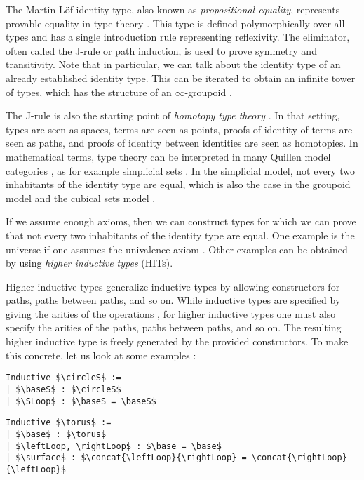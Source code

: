 The Martin-Löf identity type, also known as \emph{propositional equality}, represents provable equality in type theory \cite{martin1975intuitionistic}.
This type is defined polymorphically over all types and has a single introduction rule representing reflexivity.
The eliminator, often called the J-rule or path induction, is used to prove symmetry and transitivity.
Note that in particular, we can talk about the identity type of an already established identity type.
This can be iterated to obtain an infinite tower of types, which has the structure of an $\infty$-groupoid \cite{van2011types,lumsdaine2009weak}.

The J-rule is also the starting point of \emph{homotopy type theory} \cite{hottbook}.
In that setting, types are seen as spaces, terms are seen as points, proofs of identity of terms are seen as paths,
and proofs of identity between identities are seen as homotopies.
In mathematical terms, type theory can be interpreted in many Quillen model categories \cite{awodey2009homotopy,LumsdaineW15}, as for example simplicial sets \cite{simpset}.
In the simplicial model, not every two inhabitants of the identity type are equal,
which is also the case in the groupoid model \cite{HofmannS94,MR1686862} and the cubical sets model \cite{BezemCH13}.

If we assume enough axioms, then we can construct types for which we can prove that not every two inhabitants of the identity type are equal.
One example is the universe if one assumes the univalence axiom \cite{hottbook}.
Other examples can be obtained by using \emph{higher inductive types} (HITs).

Higher inductive types generalize inductive types by allowing constructors for paths, paths between paths, and so on.
While inductive types are specified by giving the arities of the operations \cite{dybjer1994inductive},
for higher inductive types one must also specify the arities of the paths, paths between paths, and so on.
The resulting higher inductive type is freely generated by the provided constructors.
To make this concrete, let us look at some examples \cite{hottbook}:

\begin{center}
\begin{lstlisting}[mathescape=true]
Inductive $\circleS$ :=
| $\baseS$ : $\circleS$
| $\SLoop$ : $\baseS = \baseS$
\end{lstlisting}

\begin{lstlisting}[mathescape=true]
Inductive $\torus$ :=
| $\base$ : $\torus$
| $\leftLoop, \rightLoop$ : $\base = \base$
| $\surface$ : $\concat{\leftLoop}{\rightLoop} = \concat{\rightLoop}{\leftLoop}$
\end{lstlisting}
\end{center}

